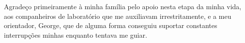 Agradeço primeiramente à minha família pelo apoio nesta etapa da minha vida, aos companheiros de laboratório que me auxiliavam irrestritamente, e a meu orientador, George, que de alguma forma conseguiu suportar constantes interrupções minhas enquanto tentava me guiar.
